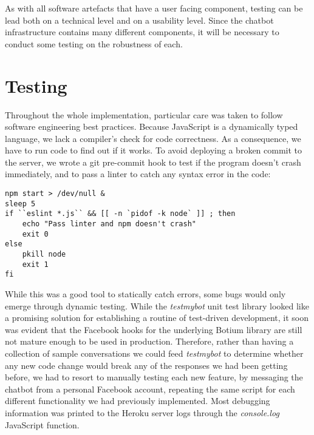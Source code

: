 As with all software artefacts that have a user facing component, testing can be lead both on a technical level and on a usability level. Since the chatbot infrastructure contains many different components, it will be necessary to conduct some testing on the robustness of each.
\section{Testing}
Throughout the whole implementation, particular care was taken to follow software engineering best practices. Because JavaScript is a dynamically typed language, we lack a compiler's check for code correctness. As a consequence, we have to run code to find out if it works. To avoid deploying a broken commit to the server, we wrote a git pre-commit hook to test if the program doesn't crash immediately, and to pass a linter to catch any syntax error in the code:
\begin{lstlisting}
npm start > /dev/null &
sleep 5
if ``eslint *.js`` && [[ -n `pidof -k node` ]] ; then
    echo "Pass linter and npm doesn't crash"
    exit 0
else
    pkill node
    exit 1
fi
\end{lstlisting}
While this was a good tool to statically catch errors, some bugs would only emerge through dynamic testing. While the \textit{testmybot} unit test library \cite{} looked like a promising solution for establishing a routine of test-driven development, it soon was evident that the Facebook hooks for the underlying Botium library \cite{} are still not mature enough to be used in production. Therefore, rather than having a collection of sample conversations we could feed \textit{testmybot} to determine whether any new code change would break any of the responses we had been getting before, we had to resort to manually testing each new feature, by messaging the chatbot from a personal Facebook account, repeating the same script for each different functionality we had previously implemented. Most debugging information was printed to the Heroku server logs through the \textit{console.log} JavaScript function.
